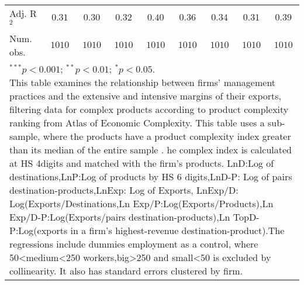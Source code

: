 \documentclass{article}
\begin{document}
\begin{table}
\begin{center}
\begin{normalsize}
\begin{tabular}{l c c c c c c c c}
Adj. R$^2$   & $0.31$       & $0.30$       & $0.32$       & $0.40$       & $0.36$       & $0.34$       & $0.31$       & $0.39$       \\
Num. obs.    & $1010$       & $1010$       & $1010$       & $1010$       & $1010$       & $1010$       & $1010$       & $1010$       \\
\hline
\multicolumn{9}{l}{\scriptsize{\parbox{1\linewidth}{\vspace{3pt}$^{***}p<0.001$; $^{**}p<0.01$; $^{*}p<0.05$. \\This table examines the relationship between firms' management practices and the extensive and intensive margins of their exports, filtering data for complex products according to product complexity ranking from Atlas of Economic Complexity. This table uses a sub-sample, where the products have a product complexity index greater than its median of the entire sample . he complex index is calculated at HS 4digits and matched with the firm's products. LnD:Log of destinations,LnP:Log of products by HS 6 digits,LnD-P: Log of pairs destination-products,LnExp: Log of Exports, LnExp/D: Log(Exports/Destinations,Ln Exp/P:Log(Exports/Products),Ln Exp/D-P:Log(Exports/pairs destination-products),Ln TopD-P:Log(exports in a firm's highest-revenue destination-product).The regressions include dummies employment as a control, where 50<medium<250 workers,big>250 and small<50 is excluded by collinearity. It also has standard errors clustered by firm.}}}
\end{tabular}
\end{normalsize}
\label{table:coefficients}
\end{center}
\end{table}
\end{document}
